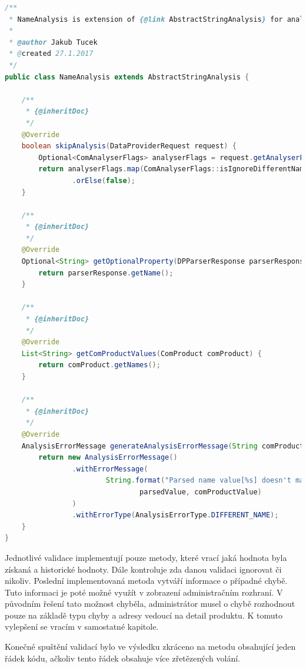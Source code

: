 \documentclass[thesis=B,czech]{FITthesis}[2012/06/26]
\begin{document}
\begin{lstlisting}[language=Java, caption={Validace kontrolující hodnotu získaného jména produktu}]
/**
 * NameAnalysis is extension of {@link AbstractStringAnalysis} for analysing Name.
 *
 * @author Jakub Tucek
 * @created 27.1.2017
 */
public class NameAnalysis extends AbstractStringAnalysis {

    /**
     * {@inheritDoc}
     */
    @Override
    boolean skipAnalysis(DataProviderRequest request) {
        Optional<ComAnalyserFlags> analyserFlags = request.getAnalyserFlags();
        return analyserFlags.map(ComAnalyserFlags::isIgnoreDifferentName)
                .orElse(false);
    }

    /**
     * {@inheritDoc}
     */
    @Override
    Optional<String> getOptionalProperty(DPParserResponse parserResponse) {
        return parserResponse.getName();
    }

    /**
     * {@inheritDoc}
     */
    @Override
    List<String> getComProductValues(ComProduct comProduct) {
        return comProduct.getNames();
    }

    /**
     * {@inheritDoc}
     */
    @Override
    AnalysisErrorMessage generateAnalysisErrorMessage(String comProductValue, String parsedValue) {
        return new AnalysisErrorMessage()
                .withErrorMessage(
                        String.format("Parsed name value[%s] doesn't match known name value[%s]",
                                parsedValue, comProductValue)
                )
                .withErrorType(AnalysisErrorType.DIFFERENT_NAME);
    }
}
\end{lstlisting}
Jednotlivé validace implementují pouze metody, které vrací jaká hodnota byla získaná a historické hodnoty. Dále kontroluje zda
danou validaci ignorovat či nikoliv. Poslední implementovaná metoda vytváří informace o případné chybě. Tuto informaci je poté
možné využít v zobrazení administračním rozhraní. V původním řešení tato možnost chyběla, administrátor musel o chybě rozhodnout pouze
na základě typu chyby a adresy vedoucí na detail produktu. K tomuto vylepšení se vracím v samostatné kapitole.
\par
Konečné spuštění validací bylo ve výsledku zkráceno na metodu obsahující jeden řádek kódu, ačkoliv tento řádek
obsahuje více zřetězených volání.
\par
\end{document}
